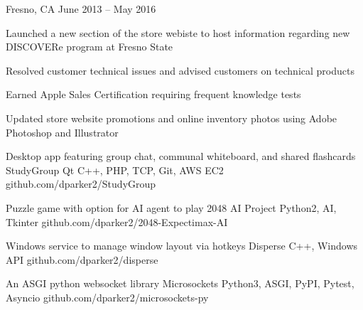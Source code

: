 \documentclass[]{awesome-cv}
\begin{document}
\begin{cventries}
	{Fresno, CA}
	{June 2013 – May 2016}
	{\begin{cvitems}
		\item {Launched a new section of the store webiste to host information regarding new DISCOVERe program at Fresno State}
		\item {Resolved customer technical issues and advised customers on technical products}
		\item {Earned Apple Sales Certification requiring frequent knowledge tests}
		\item {Updated store website promotions and online inventory photos using Adobe Photoshop and Illustrator}
		\end{cvitems}}
\end{cventries}

\begin{cventries}
	\cventry
	{Desktop app featuring group chat, communal whiteboard, and shared flashcards}
	{StudyGroup}
	{Qt C++, PHP, TCP, Git, AWS EC2}
	{github.com/dparker2/StudyGroup}
	{}

	\vspace{-5mm}
	\cventry
	{Puzzle game with option for AI agent to play}
	{2048 AI Project}
	{Python2, AI, Tkinter}
	{github.com/dparker2/2048-Expectimax-AI}
	{}

	\vspace{-5mm}
	\cventry
	{Windows service to manage window layout via hotkeys}
	{Disperse}
	{C++, Windows API}
	{github.com/dparker2/disperse}
	{}

	\vspace{-5mm}
	\cventry
	{An ASGI python websocket library}
	{Microsockets}
	{Python3, ASGI, PyPI, Pytest, Asyncio}
	{github.com/dparker2/microsockets-py}
	{}
	
	\vspace{-5mm}
\end{cventries}

\ 
\end{document}
